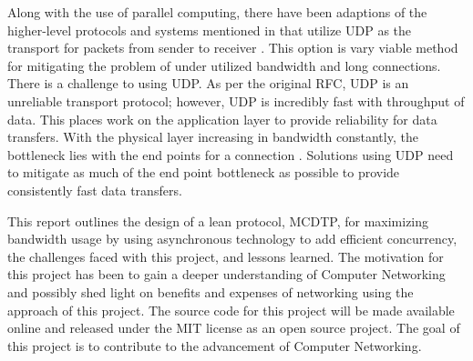 Along with the use of parallel computing, there have been adaptions of the higher-level protocols and systems mentioned in \cite{Fan2010} that utilize UDP as the transport for packets from sender to receiver \cite{He2002}\cite{Aspera2016}\cite{Fan2010}\cite{Meiss2007}\cite{gu2007udt}. This option is vary viable method for mitigating the problem of under utilized bandwidth and long connections. There is a challenge to using UDP. As per the original RFC, UDP is an unreliable transport protocol; however, UDP is incredibly fast with throughput of data. This places work on the application layer to provide reliability for data transfers. With the physical layer increasing in bandwidth constantly, the bottleneck lies with the end points for a connection \cite{Aspera2016}\cite{Fan2010}. Solutions using UDP need to mitigate as much of the end point bottleneck as possible to provide consistently fast data transfers.

This report outlines the design of a lean protocol, MCDTP, for maximizing bandwidth usage by using asynchronous technology to add efficient concurrency, the challenges faced with this project, and lessons learned. The motivation for this project has been to gain a deeper understanding of Computer Networking and possibly shed light on benefits and expenses of networking using the approach of this project. The source code for this project will be made available online and released under the MIT license as an open source project. The goal of this project is to contribute to the advancement of Computer Networking.
